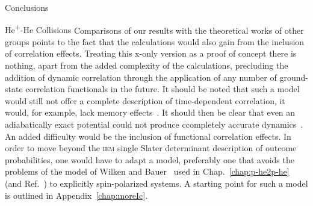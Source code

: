\documentclass[a5paper, 9 pt]{extreport}
\begin{document}
\begin{chapter}{Conclusions \label{chap:con}}
\begin{section}{\texorpdfstring{He\textsuperscript{+}}{He+}-He Collisions \label{sec:con-hephe}}
      Comparisons of our results with the theoretical works of other groups points to the fact that the
      calculations would also gain from the inclusion of correlation effects. Treating this x-only
      version as a proof of concept there is nothing, apart from the added complexity of the
      calculations, precluding the addition of dynamic correlation through the application of any number
      of ground-state correlation functionals in the future. It should be noted that such a model would
      still not offer a complete description of time-dependent correlation, it would, for example, lack
      memory effects~\cite{tddft}. It should then be clear that even an adiabatically exact potential
      could not produce ccompletely accurate dynamics~\cite{adiabaticNoGood}. An added difficulty would
      be the inclusion of functional correlation effects. In order to move beyond the \textsc{iem}
      single Slater determinant description of outcome probabilities, one would have to adapt a model,
      preferably one that avoids the problems of the model of Wilken and Bauer~\cite{wb} used in
      Chap.~\ref{chap:p-he2p-he} (and Ref.~\cite{p-he2p-he}) to explicitly spin-polarized systems. A
      starting point for such a model is outlined in Appendix~\ref{chap:moreIc}.

   \end{section}

\end{chapter}
\end{document}
